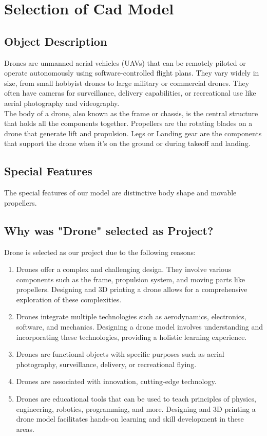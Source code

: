 \documentclass{article}
\begin{document}

\section{Selection of Cad Model}
\subsection{Object Description}
Drones are unmanned aerial vehicles (UAVs) that can be remotely piloted or operate autonomously using software-controlled flight plans. They vary widely in size, from small hobbyist drones to large military or commercial drones. They often have cameras for surveillance, delivery capabilities, or recreational use like aerial photography and videography.\\The body of a drone, also known as the frame or chassis, is the central structure that holds all the components together.
Propellers are the rotating blades on a drone that generate lift and propulsion.
Legs or Landing gear are the components that support the drone when it's on the ground or during takeoff and landing. 
\subsection{Special Features}
The special features of our model are distinctive body shape and movable propellers. 
\subsection{Why was "Drone" selected as Project? }
Drone is selected as our project due to the following reasons:
\begin{enumerate}
\item Drones offer a complex and challenging design. They involve various components such as the frame, propulsion system,  and moving parts like propellers. Designing and 3D printing a drone allows for a comprehensive exploration of these complexities.
\item Drones integrate multiple technologies such as aerodynamics, electronics, software, and mechanics. Designing a drone model involves understanding and incorporating these technologies, providing a holistic learning experience.
\item  Drones are functional objects with specific purposes such as aerial photography, surveillance, delivery, or recreational flying.
\item Drones are associated with innovation, cutting-edge technology.
\item Drones are educational tools that can be used to teach principles of physics, engineering, robotics, programming, and more. Designing and 3D printing a drone model facilitates hands-on learning and skill development in these areas.
\end{enumerate}
\end{document}

